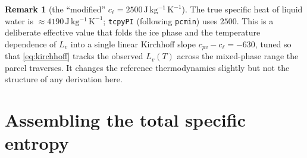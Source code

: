 \documentclass[11pt,a4paper]{article}
\theoremstyle{definition}
\newtheorem{remark}{Remark}
\newcommand{\JkgK}{\,\mathrm{J\,kg^{-1}\,K^{-1}}}
\newcommand{\cpv}{c_{pv}}
\newcommand{\cl}{c_\ell}
\newcommand{\Lv}{L_v}
\begin{document}
\begin{remark}[the ``modified'' $\cl=2500\JkgK$]\label{rem:modcl}
The true specific heat of liquid water is $\approx4190\JkgK$; \texttt{tcpyPI}
(following \texttt{pcmin}) uses $2500$. This is a deliberate effective value
that folds the ice phase and the temperature dependence of $\Lv$ into a single
linear Kirchhoff slope $\cpv-\cl=-630$, tuned so that \eqref{eq:kirchhoff}
tracks the observed $\Lv(T)$ across the mixed-phase range the parcel traverses.
It changes the reference thermodynamics slightly but not the structure of any
derivation here.
\end{remark}

\section{Assembling the total specific entropy}\label{sec:assembly}
\end{document}
